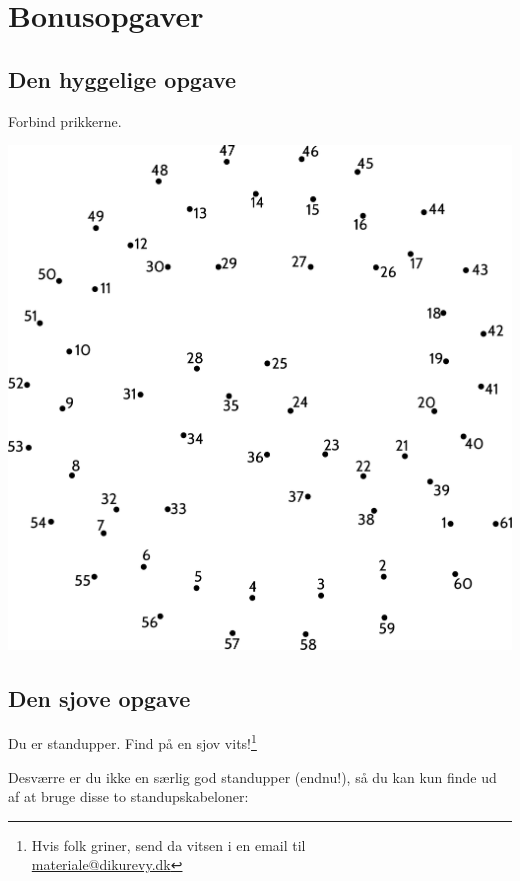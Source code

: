 \section{\huge{Bonusopgaver}}

\subsection{Den hyggelige opgave}

Forbind prikkerne.

\begin{center}
\includegraphics[width=.99\textwidth]{forbind-prikkerne.pdf}
\end{center}


\newpage

\subsection{Den sjove opgave}

Du er standupper.  Find på en sjov vits!\footnote{Hvis folk griner, send da
vitsen i en email til\\\url{materiale@dikurevy.dk}}

Desværre er du ikke en særlig god standupper (endnu!), så du kan kun finde ud af
at bruge disse to standupskabeloner:

